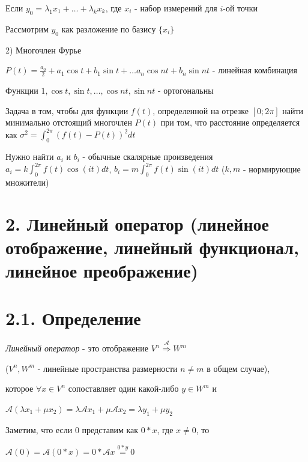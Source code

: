\documentclass[12pt]{article}
\begin{document}
    Если $y_0 = \lambda_1 x_1 + \dots + \lambda_k x_k$, где $x_i$ - набор измерений для $i$-ой точки

    Рассмотрим $y_0$ как разложение по базису $\{x_i\}$

    \vspace{5mm}

    2) Многочлен Фурье

    $P(t) = \frac{a_0}{2} + a_1 \cos t + b_1 \sin t + \dots a_n \cos nt + b_n \sin nt$ - линейная комбинация

    Функции ${1, \cos t, \sin t, \dots, \cos nt, \sin nt}$ - ортогональны

    Задача в том, чтобы для функции $f(t)$, определенной на отрезке $[0;2\pi]$ найти минимально отстоящий многочлен $P(t)$ при том,
    что расстояние определяется как $\displaystyle \sigma^2 = \int_0^{2\pi} (f(t) - P(t))^2 dt$

    Нужно найти $a_i$ и $b_i$ - обычные скалярные произведения $\displaystyle a_i = k \int_0^{2\pi} f(t) \cos(it) dt$, $\displaystyle b_i = m \int_0^{2\pi} f(t) \sin(it) dt$ ($k, m$ - нормирующие множители)

    \clearpage

    \section{2. Линейный оператор (линейное отображение, линейный функционал, линейное преображение)}

    \hypertarget{linearoperatordefinition}{}

    \section{2.1. Определение}

    \textit{Линейный оператор} - это отображение $V^n \stackrel{\mathcal{A}}{\Longrightarrow} W^m$

    ($V^n, W^m$ - линейные пространства размерности $n \neq m$ в общем случае),

    которое $\forall x \in V^n$ сопоставляет один какой-либо $y \in W^m$ и

    $\mathcal{A} (\lambda x_1 + \mu x_2) = \lambda \mathcal{A} x_1 + \mu \mathcal{A} x_2 = \lambda y_1 + \mu y_2$

    \Nota Заметим, что если 0 представим как $0 * x$, где $x \neq 0$, то

    $\mathcal{A}(0) = \mathcal{A}(0 * x) = 0 * \mathcal{A}x \stackrel{0 * y}{=} 0$
\end{document}
